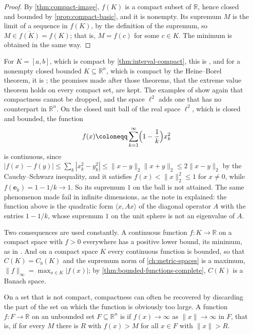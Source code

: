 \begin{proof}
By \cref{thm:compact-image}, $f(K)$ is a compact subset of $\mathbb R$, hence closed and bounded by \cref{prop:compact-basic}, and it is nonempty. Its supremum $M$ is the limit of a sequence in $f(K)$, by the definition of the supremum, so $M\in\overline{f(K)}=f(K)$; that is, $M=f(c)$ for some $c\in K$. The minimum is obtained in the same way.
\end{proof}

For $K=[a,b]$, which is compact by \cref{thm:interval-compact}, this is , and for a nonempty closed bounded $K\subseteq\mathbb R^n$, which is compact by the Heine--Borel theorem, it is ; the promises made after those theorems, that the extreme value theorem holds on every compact set, are kept. The examples of  show again that compactness cannot be dropped, and the space $\ell^2$ adds one that has no counterpart in $\mathbb R^n$. On the closed unit ball of the real space $\ell^2$, which is closed and bounded, the function
\[
f(x)\coloneqq\sum_{k=1}^\infty\Bigl(1-\frac1k\Bigr)x_k^2
\]
is continuous, since $|f(x)-f(y)|\le\sum_k|x_k^2-y_k^2|\le\|x-y\|_2\|x+y\|_2\le2\|x-y\|_2$ by the Cauchy--Schwarz inequality, and it satisfies $f(x)<\|x\|_2^2\le1$ for $x\ne0$, while $f(\mathbf e_k)=1-1/k\to1$. So its supremum $1$ on the ball is not attained. The same phenomenon made  fail in infinite dimensions, as the note in  explained: the function above is the quadratic form $\langle x,Ax\rangle$ of the diagonal operator $A$ with the entries $1-1/k$, whose supremum $1$ on the unit sphere is not an eigenvalue of $A$.

Two consequences are used constantly. A continuous function $f\colon K\to\mathbb R$ on a compact space with $f>0$ everywhere has a positive lower bound, its minimum, as in . And on a compact space $K$ every continuous function is bounded, so that $C(K)=C_b(K)$ and the supremum norm of \cref{ch:metric-spaces} is a maximum, $\|f\|_\infty=\max_{x\in K}|f(x)|$; by \cref{thm:bounded-functions-complete}, $C(K)$ is a Banach space.

On a set that is not compact, compactness can often be recovered by discarding the part of the set on which the function is obviously too large. A function $f\colon F\to\mathbb R$ on an unbounded set $F\subseteq\mathbb R^n$ is  if $f(x)\to\infty$ as $\|x\|\to\infty$ in $F$, that is, if for every $M$ there is $R$ with $f(x)>M$ for all $x\in F$ with $\|x\|>R$.

